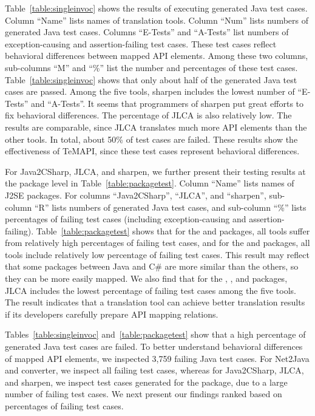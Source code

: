 Table~\ref{table:singleinvoc} shows the results of executing generated Java test cases. Column ``Name'' lists names of translation tools. Column ``Num'' lists numbers of generated Java test cases. Columns ``E-Tests'' and ``A-Tests'' list numbers of exception-causing and assertion-failing test cases. These test cases reflect behavioral differences between mapped API elements. Among these two columns, sub-columns ``M'' and ``\%'' list the number and percentages of these test cases. Table~\ref{table:singleinvoc} shows that only about half of the generated Java test cases are passed. Among the five tools, sharpen includes the lowest number of ``E-Tests'' and ``A-Tests''. It seems that programmers of sharpen put great efforts to fix behavioral differences. The percentage of JLCA is also relatively low. The results are comparable, since JLCA translates much more API elements than the other tools. In total, about 50\% of test cases are failed. These results show the effectiveness of TeMAPI, since these test cases represent behavioral differences.


For Java2CSharp, JLCA, and sharpen, we further present their testing results at the package level in Table~\ref{table:packagetest}. Column ``Name'' lists names of J2SE packages. For columns ``Java2CSharp'', ``JLCA'', and ``sharpen'', sub-column ``R'' lists numbers of generated Java test cases, and sub-column ``\%'' lists percentages of failing test cases (including exception-causing and assertion-failing). Table~\ref{table:packagetest} shows that for the  and  packages, all tools suffer from relatively high percentages of failing test cases, and for the  and  packages, all tools include relatively low percentage of failing test cases. This result may reflect that some packages between Java and C\# are more similar than the others, so they can be more easily mapped. We also find that for the , , and  packages, JLCA includes the lowest percentage of failing test cases among the five tools. The result indicates that a translation tool can achieve better translation results if its developers carefully prepare API mapping relations.

Tables~\ref{table:singleinvoc} and~\ref{table:packagetest} show that a high percentage of generated Java test cases are failed. To better understand behavioral differences of mapped API elements, we inspected 3,759 failing Java test cases. For Net2Java and converter, we inspect all failing test cases, whereas for Java2CSharp, JLCA, and sharpen, we inspect test cases generated for the  package, due to a large number of failing test cases. We next present our findings ranked based on percentages of failing test cases.

